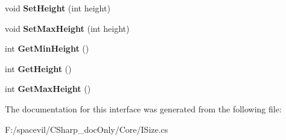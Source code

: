 \begin{DoxyCompactItemize}
void {\bfseries Set\+Height} (int height)
\item 
\mbox{\label{interface_space_v_i_l_1_1_core_1_1_i_size_a3717d11086772867d022652a06443e72}} 
void {\bfseries Set\+Max\+Height} (int height)
\item 
\mbox{\label{interface_space_v_i_l_1_1_core_1_1_i_size_a581efdd6c7fa9ef6938a87d24a276fd5}} 
int {\bfseries Get\+Min\+Height} ()
\item 
\mbox{\label{interface_space_v_i_l_1_1_core_1_1_i_size_a3989030b1e4cb112f049e60059f2d82b}} 
int {\bfseries Get\+Height} ()
\item 
\mbox{\label{interface_space_v_i_l_1_1_core_1_1_i_size_a620775c8c2d4300af33bfac30ff6bc93}} 
int {\bfseries Get\+Max\+Height} ()
\end{DoxyCompactItemize}


The documentation for this interface was generated from the following file\+:\begin{DoxyCompactItemize}
\item 
F\+:/spacevil/\+C\+Sharp\+\_\+doc\+Only/\+Core/I\+Size.\+cs\end{DoxyCompactItemize}
